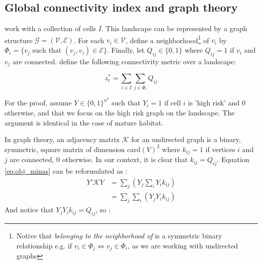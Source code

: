 
\subsection{Global connectivity index and graph theory}

\label{sec:connectivity}


\cite{minas_spatial_2014} work with a collection of cells $I$. This landscape can be represented by a graph structure $\mathcal{G}=(\mathcal{V}, \mathcal{E})$.
For each $v_i \in \mathcal{V}$, define a neighborhood\footnote{Notive that \textit{belonging to the neighborhood of} is a symmetric binary relationship e.g. if $v_i \in \Phi_j \iff v_j \in \Phi_i$, as we are working with undirected graphs} of $v_i$ by $\Phi_i = \{ v_j \text{ such that } (v_j, v_i) \in \mathcal{E} \}$. 
Finally, let $Q_{ij} \in \{0,1\}$ where $Q_{ij}=1$ if $v_i$ and $v_j$ are connected. \cite{minas_spatial_2014} define the following connectivity metric over a landscape: 

\begin{equation}
    z^*_t = \sum_{i \in I}\sum_{j \in \Phi_i}Q_{ij}
    \label{eq:obj_minas}
\end{equation}

For the proof, assume $Y \in \{0,1\}^{n^2}$ such that $Y_i=1$ if cell $i$ is 'high risk' and $0$ otherwise, and that we focus on the high risk graph on the landscape. The argument is identical in the case of mature habitat. 

In graph theory, an adjacency matrix $\mathcal{K}$ for an undirected graph is a binary, symmetric, square matrix of dimension $\mathrm{card}(V)^2$ where $k_{ij}=1$ if vertices $i$ and $j$ are connected, $0$ otherwise. In our context, it is clear that $k_{ij}=Q_{ij}$. Equation \ref{eq:obj_minas} can be reformulated as : 
\begin{align*}
    Y' \mathcal{K} Y &= \sum_j\left( Y_j \sum_i Y_i k_{ij}\right)\\
    &= \sum_j \sum_i \left( Y_j Y_i k_{ij}\right)
\end{align*}
And notice that $Y_j Y_i k_{ij} = Q_{ij}$, so :

